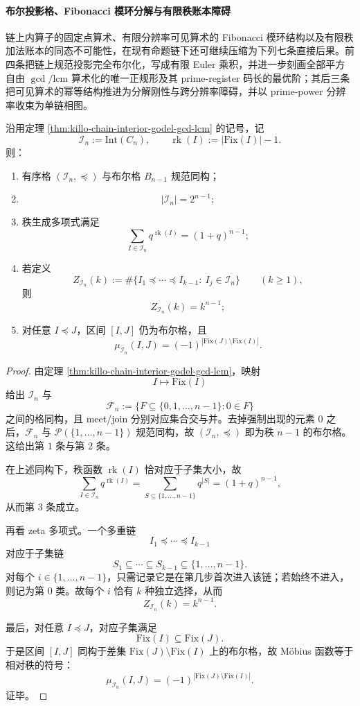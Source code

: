 \paragraph{布尔投影格、Fibonacci 模环分解与有限秩账本障碍}
链上内算子的固定点算术、有限分辨率可见算术的 Fibonacci 模环结构以及有限秩加法账本的同态不可能性，在现有命题链下还可继续压缩为下列七条直接后果。前四条把链上规范投影完全布尔化，写成有限 Euler 乘积，并进一步刻画全部平方自由 \(\gcd/\mathrm{lcm}\) 算术化的唯一正规形及其 prime-register 码长的最优阶；其后三条把可见算术的幂等结构推进为分解刚性与跨分辨率障碍，并以 prime-power 分辨率收束为单链相图。

\begin{theorem}[链上内算子格的布尔刚性与旗标闭式]\label{thm:xi-chain-interior-boolean-flag-closed-form}
沿用定理 \ref{thm:killo-chain-interior-godel-gcd-lcm} 的记号，记
\[
\mathcal I_n:=\mathrm{Int}(C_n),
\qquad
\operatorname{rk}(I):=|\mathrm{Fix}(I)|-1.
\]
则：
\begin{enumerate}
  \item 有序格 \((\mathcal I_n,\preceq)\) 与布尔格 \(B_{n-1}\) 规范同构；
  \item
  \[
  |\mathcal I_n|=2^{n-1};
  \]
  \item 秩生成多项式满足
  \[
  \sum_{I\in\mathcal I_n}q^{\operatorname{rk}(I)}=(1+q)^{n-1};
  \]
  \item 若定义
  \[
  Z_{\mathcal I_n}(k)
  :=
  \#\{I_1\preceq\cdots\preceq I_{k-1}:\ I_j\in\mathcal I_n\}
  \qquad(k\ge 1),
  \]
  则
  \[
  Z_{\mathcal I_n}(k)=k^{n-1};
  \]
  \item 对任意 \(I\preceq J\)，区间 \([I,J]\) 仍为布尔格，且
  \[
  \mu_{\mathcal I_n}(I,J)=(-1)^{|\mathrm{Fix}(J)\setminus \mathrm{Fix}(I)|}.
  \]
\end{enumerate}
\end{theorem}
\begin{proof}
由定理 \ref{thm:killo-chain-interior-godel-gcd-lcm}，映射
\[
I\longmapsto \mathrm{Fix}(I)
\]
给出 \(\mathcal I_n\) 与
\[
\mathcal F_n:=\{F\subseteq \{0,1,\dots,n-1\}:0\in F\}
\]
之间的格同构，且 meet/join 分别对应集合交与并。去掉强制出现的元素 \(0\) 之后，\(\mathcal F_n\) 与 \(\mathcal P(\{1,\dots,n-1\})\) 规范同构，故 \((\mathcal I_n,\preceq)\) 即为秩 \(n-1\) 的布尔格。这给出第 \(1\) 条与第 \(2\) 条。

在上述同构下，秩函数 \(\operatorname{rk}(I)\) 恰对应于子集大小，故
\[
\sum_{I\in\mathcal I_n}q^{\operatorname{rk}(I)}
=
\sum_{S\subseteq\{1,\dots,n-1\}}q^{|S|}
=(1+q)^{n-1},
\]
从而第 \(3\) 条成立。

再看 zeta 多项式。一个多重链
\[
I_1\preceq\cdots\preceq I_{k-1}
\]
对应于子集链
\[
S_1\subseteq \cdots\subseteq S_{k-1}\subseteq \{1,\dots,n-1\}.
\]
对每个 \(i\in\{1,\dots,n-1\}\)，只需记录它是在第几步首次进入该链；若始终不进入，则记为第 \(0\) 类。故每个 \(i\) 恰有 \(k\) 种独立选择，从而
\[
Z_{\mathcal I_n}(k)=k^{n-1}.
\]

最后，对任意 \(I\preceq J\)，对应子集满足
\[
\mathrm{Fix}(I)\subseteq \mathrm{Fix}(J).
\]
于是区间 \([I,J]\) 同构于差集 \(\mathrm{Fix}(J)\setminus \mathrm{Fix}(I)\) 上的布尔格，故 Möbius 函数等于相对秩的符号：
\[
\mu_{\mathcal I_n}(I,J)=(-1)^{|\mathrm{Fix}(J)\setminus \mathrm{Fix}(I)|}.
\]
证毕。
\end{proof}

